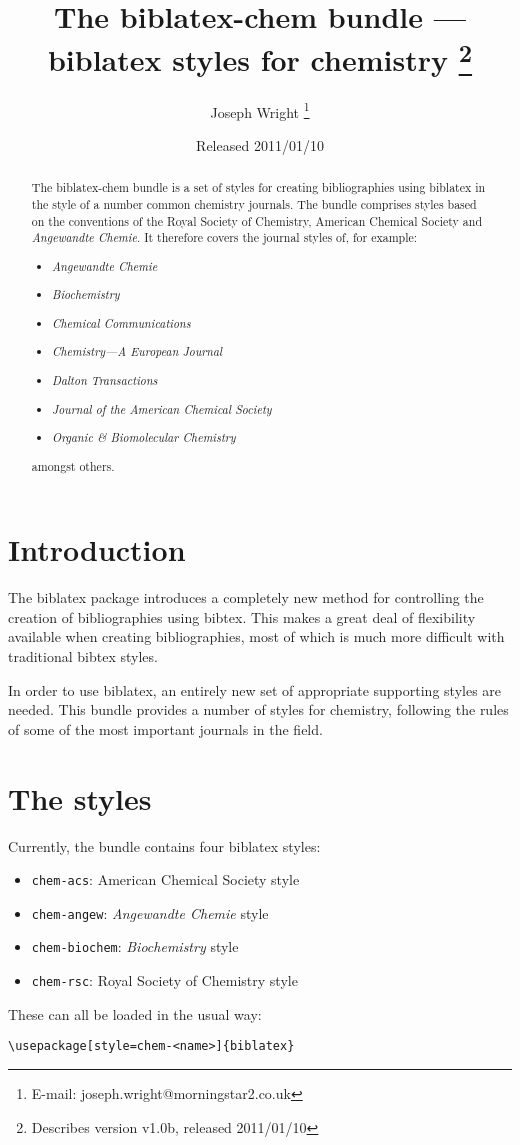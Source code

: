 \documentclass[a4paper]{article}
\title{The \textsf{biblatex-chem} bundle --- 
  \textsf{biblatex} styles for chemistry%
  \thanks{Describes version v1.0b, released 2011/01/10}}
\author{Joseph Wright%
  \thanks{E-mail: joseph.wright@morningstar2.co.uk}}
\date{Released 2011/01/10}
\begin{document}
\maketitle
\begin{abstract}
The \textsf{biblatex-chem} bundle is a set of styles for 
creating bibliographies using \textsf{biblatex} in the style of
a number common chemistry journals.  The bundle comprises styles
based on the conventions of the Royal Society of Chemistry, 
American Chemical Society and 	\emph{Angewandte Chemie}. It
therefore covers the journal styles of, for example:
\begin{itemize}
  \item \emph{Angewandte Chemie}
  \item \emph{Biochemistry}
  \item \emph{Chemical Communications}
  \item \emph{Chemistry---A European Journal}
  \item \emph{Dalton Transactions}
  \item \emph{Journal of the American Chemical Society}
  \item \emph{Organic \& Biomolecular Chemistry}
\end{itemize}
amongst others.
\end{abstract}

\begin{multicols}{2}
  \tableofcontents
\end{multicols}

\section{Introduction}
The \textsf{biblatex} package introduces a completely new method
for controlling the creation of bibliographies using
\textsf{bibtex}. This makes a great deal of flexibility 
available when creating bibliographies, most of which is much 
more difficult with traditional \textsf{bibtex} styles.

In order to use \textsf{biblatex}, an entirely new set of 
appropriate supporting styles are needed. This bundle provides a
number of styles for chemistry, following the rules of some of 
the most important journals in the field. 

\section{The styles}

Currently, the bundle contains four \textsf{biblatex} styles:
\begin{itemize}
  \item \texttt{chem-acs}: American Chemical Society style
  \item \texttt{chem-angew}: \emph{Angewandte Chemie} style
  \item \texttt{chem-biochem}: \emph{Biochemistry} style
  \item \texttt{chem-rsc}: Royal Society of Chemistry style
\end{itemize}
These can all be loaded in the usual way:
\begin{verbatim}
\usepackage[style=chem-<name>]{biblatex}
\end{verbatim}
\end{document}

